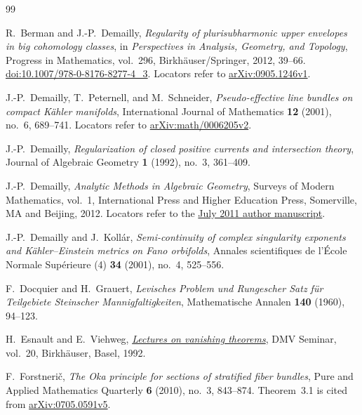 \begin{thebibliography}{99}
\raggedright

R.~Berman and J.-P.~Demailly,
\emph{Regularity of plurisubharmonic upper envelopes in big cohomology classes},
in \emph{Perspectives in Analysis, Geometry, and Topology},
Progress in Mathematics, vol.~296, Birkh\"auser/Springer, 2012, 39--66.
\href{https://doi.org/10.1007/978-0-8176-8277-4_3}{doi:10.1007/978-0-8176-8277-4\_3}.
Locators refer to \href{https://arxiv.org/abs/0905.1246v1}{arXiv:0905.1246v1}.

J.-P.~Demailly, T.~Peternell, and M.~Schneider,
\emph{Pseudo-effective line bundles on compact K\"ahler manifolds},
International Journal of Mathematics \textbf{12} (2001), no.~6, 689--741.
Locators refer to \href{https://arxiv.org/abs/math/0006205v2}{arXiv:math/0006205v2}.

J.-P.~Demailly,
\emph{Regularization of closed positive currents and intersection theory},
Journal of Algebraic Geometry \textbf{1} (1992), no.~3, 361--409.

J.-P.~Demailly,
\emph{Analytic Methods in Algebraic Geometry},
Surveys of Modern Mathematics, vol.~1,
International Press and Higher Education Press, Somerville, MA and Beijing, 2012.
Locators refer to the
\href{https://www-fourier.univ-grenoble-alpes.fr/~demailly/manuscripts/analmeth_book.pdf}{July 2011 author manuscript}.

J.-P.~Demailly and J.~Koll\'ar,
\emph{Semi-continuity of complex singularity exponents and K\"ahler--Einstein metrics on Fano orbifolds},
Annales scientifiques de l'\'Ecole Normale Sup\'erieure (4)
\textbf{34} (2001), no.~4, 525--556.

F.~Docquier and H.~Grauert,
\emph{Levisches Problem und Rungescher Satz f\"ur Teilgebiete Steinscher Mannigfaltigkeiten},
Mathematische Annalen \textbf{140} (1960), 94--123.

H.~Esnault and E.~Viehweg,
\emph{\href{https://page.mi.fu-berlin.de/esnault/books/esvibuch.pdf}{Lectures on vanishing theorems}},
DMV Seminar, vol.~20, Birkh\"auser, Basel, 1992.

F.~Forstneri\v c,
\emph{The Oka principle for sections of stratified fiber bundles},
Pure and Applied Mathematics Quarterly \textbf{6} (2010), no.~3, 843--874.
Theorem~3.1 is cited from
\href{https://arxiv.org/abs/0705.0591v5}{arXiv:0705.0591v5}.


\end{thebibliography}
